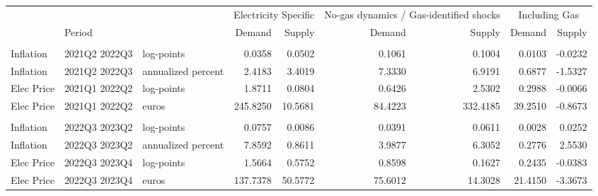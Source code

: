 \begin{table}[!t]
\fontsize{12.0pt}{14.4pt}\selectfont
\begin{tabular*}{\linewidth}{@{\extracolsep{\fill}}lllrrrrrr}
\toprule
 &  &  & \multicolumn{2}{c}{Electricity Specific} & \multicolumn{2}{c}{No-gas dynamics / Gas-identified shocks} & \multicolumn{2}{c}{Including Gas} \\ 
\cmidrule(lr){4-5} \cmidrule(lr){6-7} \cmidrule(lr){8-9}
 & Period &  & Demand & Supply & Demand & Supply & Demand & Supply \\ 
\midrule\addlinespace[2.5pt]
\multicolumn{9}{l}{{\bfseries Energy crisis}} \\[2.5pt] 
\midrule\addlinespace[2.5pt]
Inflation & 2021Q2 2022Q3 & log-points & 0.0358 & 0.0502 & 0.1061 & 0.1004 & 0.0103 & -0.0232 \\ 
Inflation & 2021Q2 2022Q3 & annualized percent & 2.4183 & 3.4019 & 7.3330 & 6.9191 & 0.6877 & -1.5327 \\ 
Elec Price & 2021Q1 2022Q2 & log-points & 1.8711 & 0.0804 & 0.6426 & 2.5302 & 0.2988 & -0.0066 \\ 
Elec Price & 2021Q1 2022Q2 & euros & 245.8250 & 10.5681 & 84.4223 & 332.4185 & 39.2510 & -0.8673 \\ 
\midrule\addlinespace[2.5pt]
\multicolumn{9}{l}{{\bfseries Post-Crisis Normalization}} \\[2.5pt] 
\midrule\addlinespace[2.5pt]
Inflation & 2022Q3 2023Q2 & log-points & 0.0757 & 0.0086 & 0.0391 & 0.0611 & 0.0028 & 0.0252 \\ 
Inflation & 2022Q3 2023Q2 & annualized percent & 7.8592 & 0.8611 & 3.9877 & 6.3052 & 0.2776 & 2.5530 \\ 
Elec Price & 2022Q3 2023Q4 & log-points & 1.5664 & 0.5752 & 0.8598 & 0.1627 & 0.2435 & -0.0383 \\ 
Elec Price & 2022Q3 2023Q4 & euros & 137.7378 & 50.5772 & 75.6012 & 14.3028 & 21.4150 & -3.3673 \\ 
\bottomrule
\end{tabular*}
\end{table}

